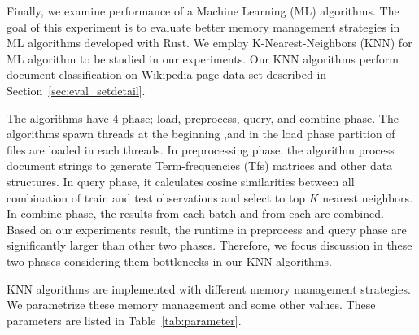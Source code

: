 Finally, we examine performance of a Machine Learning (ML) algorithms. 
The goal of this experiment is to evaluate better memory management strategies in ML algorithms developed with Rust.
We employ K-Nearest-Neighbors (KNN) for ML algorithm to be studied in our experiments.
Our KNN algorithms perform document classification on Wikipedia page data set described in Section~\ref{sec:eval_setdetail}. 

The algorithms have 4 phase; load, preprocess, query, and combine phase. 
The algorithms spawn threads at the beginning ,and in the load phase partition of files are loaded in each threads. 
In preprocessing phase, the algorithm process document strings to generate Term-frequencies (Tfs) matrices and other data structures. 
In query phase, it calculates cosine similarities between all combination of train and test observations and select to top \(K\) nearest neighbors. 
In combine phase, the results from each batch and from each are combined. 
Based on our experiments result, the runtime in preprocess and query phase are significantly larger than other two phases.
Therefore, we focus discussion in these two phases considering them bottlenecks in our KNN algorithms.

KNN algorithms are implemented with different memory management strategies. 
We parametrize these memory management and some other values. These parameters are listed in Table~\ref{tab:parameter}. 


